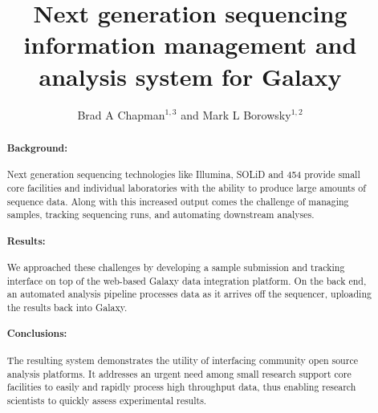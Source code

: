 \documentclass[10pt]{bmc_article}
\newenvironment{bmcformat}{\begin{raggedright}\baselineskip20pt\sloppy\setboolean{publ}{false}}{\end{raggedright}\baselineskip20pt\sloppy}
\begin{document}
\begin{bmcformat}


\title{Next generation sequencing information management and analysis
  system for Galaxy}

\author{Brad A Chapman\correspondingauthor$^{1,3}$%
      and
         Mark L Borowsky$^{1,2}$%
      }

\address{%
    \iid(1)Department of Molecular Biology, Simches Research Center,%
    Massachusetts General Hospital, Boston, MA 02114, USA
    \iid(2)Department of Genetics,%
    Harvard Medical School, Boston, MA, USA
    \iid(3)Harvard School of Public Health,%
    SPH2, Room 437A, 655 Huntington Ave  Boston, MA 02115, USA
}%

\maketitle

\begin{abstract}
  \paragraph*{Background:} Next generation sequencing technologies
  like Illumina, SOLiD and 454 provide small core facilities and
  individual laboratories with the ability to produce large amounts of sequence
  data. Along with this increased output comes the challenge of
  managing samples, tracking sequencing runs, and automating downstream
  analyses.
  \paragraph*{Results:} We approached these challenges by developing a
  sample submission and tracking interface on top of the web-based
  Galaxy data integration platform. On the back end, an automated
  analysis pipeline processes data as it arrives off the sequencer,
  uploading the results back into Galaxy.
  \paragraph*{Conclusions:} The resulting system demonstrates the
  utility of interfacing community open source analysis platforms.
  It addresses an urgent need among small research support core
  facilities to easily and rapidly process high throughput data, thus
  enabling research scientists to quickly assess experimental
  results.
\end{abstract}


\end{bmcformat}
\end{document}
